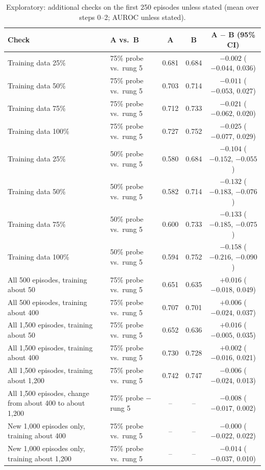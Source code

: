 \documentclass[11pt]{article}
\begin{document}
\begin{table}[t]
\centering\small
\caption{Exploratory: additional checks on the first 250 episodes unless stated (mean over steps 0--2; AUROC unless stated).}\label{tab:extra}
\begin{tabularx}{\linewidth}{@{}LLccc@{}}
\toprule
Check & A vs.\ B & A & B & A $-$ B (95\% CI) \\
\midrule
Training data 25\% & 75\% probe vs.\ rung 5 & 0.681 & 0.684 & $-0.002$ ($-0.044$, 0.036) \\
Training data 50\% & 75\% probe vs.\ rung 5 & 0.703 & 0.714 & $-0.011$ ($-0.053$, 0.027) \\
Training data 75\% & 75\% probe vs.\ rung 5 & 0.712 & 0.733 & $-0.021$ ($-0.062$, 0.020) \\
Training data 100\% & 75\% probe vs.\ rung 5 & 0.727 & 0.752 & $-0.025$ ($-0.077$, 0.029) \\
Training data 25\% & 50\% probe vs.\ rung 5 & 0.580 & 0.684 & $-0.104$ ($-0.152$, $-0.055$) \\
Training data 50\% & 50\% probe vs.\ rung 5 & 0.582 & 0.714 & $-0.132$ ($-0.183$, $-0.076$) \\
Training data 75\% & 50\% probe vs.\ rung 5 & 0.600 & 0.733 & $-0.133$ ($-0.185$, $-0.075$) \\
Training data 100\% & 50\% probe vs.\ rung 5 & 0.594 & 0.752 & $-0.158$ ($-0.216$, $-0.090$) \\
All 500 episodes, training about 50 & 75\% probe vs.\ rung 5 & 0.651 & 0.635 & $+0.016$ ($-0.018$, 0.049) \\
All 500 episodes, training about 400 & 75\% probe vs.\ rung 5 & 0.707 & 0.701 & $+0.006$ ($-0.024$, 0.037) \\
All 1,500 episodes, training about 50 & 75\% probe vs.\ rung 5 & 0.652 & 0.636 & $+0.016$ ($-0.005$, 0.035) \\
All 1,500 episodes, training about 400 & 75\% probe vs.\ rung 5 & 0.730 & 0.728 & $+0.002$ ($-0.016$, 0.021) \\
All 1,500 episodes, training about 1,200 & 75\% probe vs.\ rung 5 & 0.742 & 0.747 & $-0.006$ ($-0.024$, 0.013) \\
All 1,500 episodes, change from about 400 to about 1,200 & 75\% probe $-$ rung 5 & -- & -- & $-0.008$ ($-0.017$, 0.002) \\
New 1,000 episodes only, training about 400 & 75\% probe vs.\ rung 5 & -- & -- & $-0.000$ ($-0.022$, 0.022) \\
New 1,000 episodes only, training about 1,200 & 75\% probe vs.\ rung 5 & -- & -- & $-0.014$ ($-0.037$, 0.010) \\

\end{tabularx}
\end{table}
\end{document}
